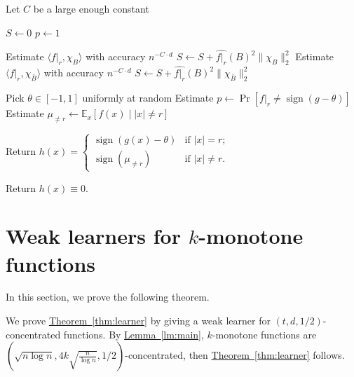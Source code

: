 \documentclass[11pt]{article}
\numberwithin{equation}{section}
\theoremstyle{definition}
\theoremstyle{plain}
\newcommand{\expref}[2]{\hyperref[#2]{#1~\ref{#2}}}
\newcommand{\Braket}[1]{\langle#1\rangle}
\begin{document}
%
\begin{algorithm}[t]
\caption{A weak learner for $(t,d, 1/2)$-concentrated functions}
\label{alg:learner}
  Let $C$ be a large enough constant\;
 {
     $S\leftarrow 0$\;
     $p\leftarrow 1$\;
     {
        {
            Estimate $\Braket{f|_r, \chi_B}$ with accuracy $n^{-C\cdot d}$\;
            $S\leftarrow S+\widehat{f|_r}(B)^2\| \chi_B\|_2^2$\;
        }\Else
        {
            Estimate $\Braket{f|_r, \chi_{\bar{B}}}$ with accuracy $n^{-C\cdot d}$\;
            $S\leftarrow S+\widehat{f|_r}(B)^2\| \chi_{\bar{B}}\|_2^2$\;
        }
          
     }
       {

        {
            Pick $\theta \in [-1,1]$ uniformly at random\;
            Estimate $p\leftarrow\Pr[f|_r\neq\operatorname{sign}(g-\theta)]$\;
        }
        Estimate $\mu_{\neq r}\leftarrow \mathbb{E}_{x}[f(x)\mid |x|\neq r]$\;

        Return $h(x)=\begin{cases}
                         \operatorname{sign}(g(x)-\theta) & \mbox{if } |x|=r;\\
                        \operatorname{sign}(\mu_{\neq r}) & \mbox{if } |x|\neq r.
                     \end{cases}$
        }
  
 }
 Return $h(x)\equiv 0$.
\end{algorithm}

\section{Weak learners for $k$-monotone functions}
In this section, we prove the following theorem.

\learner*

We prove \expref{Theorem}{thm:learner} by giving a weak learner for $(t,d,1/2)$-concentrated functions. By \expref{Lemma}{lm:main}, $k$-monotone functions are $\left(\sqrt{n\log n},4k\sqrt{\frac{n}{\log n}},1/2\right)$-concentrated, then \expref{Theorem}{thm:learner} follows.
\end{document}
